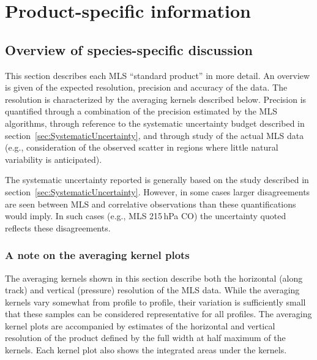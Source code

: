 \chapter{Product-specific information}
\label{chap:Results}


\section{Overview of species-specific discussion}

This section describes each MLS \thisv\CheckThis ``standard product'' in more detail.  An overview is given of the expected resolution, precision and accuracy of the data.  The resolution is characterized by the averaging kernels described below.  Precision is quantified through a combination of the precision estimated by the MLS \thisv\CheckThis algorithms, through reference to the systematic uncertainty budget described in section~\ref{sec:SystematicUncertainty}, and through study of the actual MLS data (e.g., consideration of the observed scatter in regions where little natural variability is anticipated).

The systematic uncertainty reported is generally based on the study described in section~\ref{sec:SystematicUncertainty}.  However, in some cases larger disagreements are seen between MLS and correlative observations than these quantifications would imply.  In such cases (e.g., MLS 215\,hPa CO) the uncertainty quoted reflects these disagreements.

\subsection*{A note on the averaging kernel plots}

The averaging kernels shown in this section describe both the horizontal (along track) and vertical (pressure) resolution of the MLS \thisv\CheckThis data. While the averaging kernels vary somewhat from profile to profile, their variation is sufficiently small that these samples can be considered representative for all profiles.  The averaging kernel plots are accompanied by estimates of the horizontal and vertical resolution of the product defined by the full width at half maximum of the kernels. Each kernel plot also shows the integrated areas under the kernels.

\ProductSections





















\RegularSections
\clearpage
